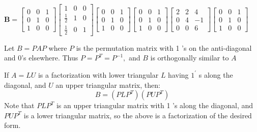 \documentclass[english,onecolumn]{IEEEtran}
\begin{document}
\begin{enumerate}
    $
    \mathbf{B} =
    \begin{bmatrix}
	0& 0&1 \\
	0&1&0\\
	1& 0 &0
	\end{bmatrix}
    \begin{bmatrix}
    	1& 0&0 \\
    	\frac{1}{2}&1&0\\
    	\frac{1}{2}& 0 &1
    \end{bmatrix}
    \begin{bmatrix}
	0& 0&1 \\
	0&1&0\\
	1& 0 &0
\end{bmatrix}
    \begin{bmatrix}
	0& 0&1 \\
	0&1&0\\
	1& 0 &0
\end{bmatrix}
    \begin{bmatrix}
    	2& 2&4 \\
    	0&4&-1\\
    	0&0&6
    \end{bmatrix}
    \begin{bmatrix}
	0& 0&1 \\
	0&1&0\\
	1& 0 &0
\end{bmatrix}
    $
    
    
    Let $B=P A P$ where $P$ is the permutation matrix with 1 's on the anti-diagonal and 0's elsewhere. Thus $P=P^{T}=P^{-1},$ and $B$ is orthogonally similar to $A$
    
    If $A=L U$ is a factorization with lower triangular $L$ having $1^{\prime}$ s along the diagonal, and $U$ an upper triangular matrix, then:
    $$
   B=\left(P L P^{T}\right)\left(P U P^{T}\right)
    $$
    Note that $P L P^{T}$ is an upper triangular matrix with 1 's along the diagonal, and $P U P^{T}$ is a lower triangular matrix, so the above is a factorization of the desired form.
    

\end{enumerate}
\end{document}
